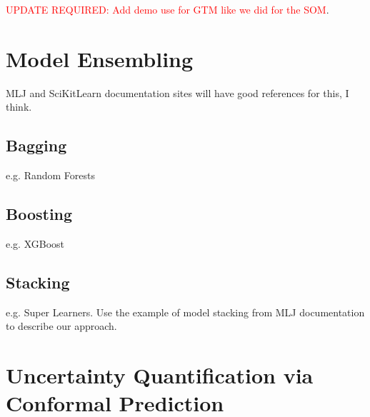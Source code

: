 \textcolor{red}{UPDATE REQUIRED: Add demo use for GTM like we did for the SOM}.





\section{Model Ensembling}
MLJ and SciKitLearn documentation sites will have good references for this, I think.
\subsection{Bagging}
e.g. Random Forests
\subsection{Boosting}
e.g. XGBoost
\subsection{Stacking}
e.g. Super Learners. Use the example of model stacking from MLJ documentation to describe our approach.




\section{Uncertainty Quantification via Conformal Prediction}

